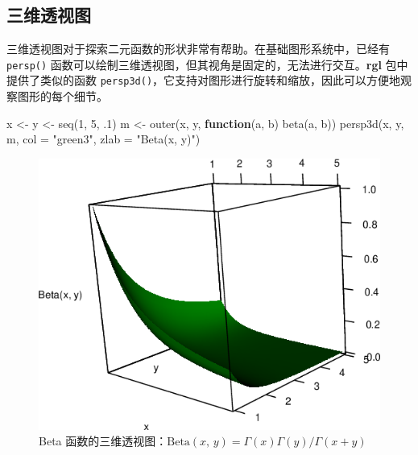 \documentclass[
  b5paper,
  UTF8,twoside]{book}
\newenvironment{Shaded}{\begin{snugshade}}{\end{snugshade}}
\newcommand{\AttributeTok}[1]{\textcolor[rgb]{0.77,0.63,0.00}{#1}}
\newcommand{\ControlFlowTok}[1]{\textcolor[rgb]{0.13,0.29,0.53}{\textbf{#1}}}
\newcommand{\DecValTok}[1]{\textcolor[rgb]{0.00,0.00,0.81}{#1}}
\newcommand{\FunctionTok}[1]{\textcolor[rgb]{0.00,0.00,0.00}{#1}}
\newcommand{\NormalTok}[1]{#1}
\newcommand{\OtherTok}[1]{\textcolor[rgb]{0.56,0.35,0.01}{#1}}
\newcommand{\StringTok}[1]{\textcolor[rgb]{0.31,0.60,0.02}{#1}}
\begin{document}
\hypertarget{ux4e09ux7ef4ux900fux89c6ux56fe}{%
\subsection{三维透视图}\label{ux4e09ux7ef4ux900fux89c6ux56fe}}

三维透视图对于探索二元函数的形状非常有帮助。在基础图形系统中，已经有 \texttt{persp()} 函数可以绘制三维透视图，但其视角是固定的，无法进行交互。\textbf{rgl} 包中提供了类似的函数 \texttt{persp3d()}，它支持对图形进行旋转和缩放，因此可以方便地观察图形的每个细节。

\begin{Shaded}
\begin{Highlighting}[]
\NormalTok{x }\OtherTok{\textless{}{-}}\NormalTok{ y }\OtherTok{\textless{}{-}} \FunctionTok{seq}\NormalTok{(}\DecValTok{1}\NormalTok{, }\DecValTok{5}\NormalTok{, .}\DecValTok{1}\NormalTok{)}
\NormalTok{m }\OtherTok{\textless{}{-}} \FunctionTok{outer}\NormalTok{(x, y, }\ControlFlowTok{function}\NormalTok{(a, b) }\FunctionTok{beta}\NormalTok{(a, b))}
\FunctionTok{persp3d}\NormalTok{(x, y, m, }\AttributeTok{col =} \StringTok{"green3"}\NormalTok{, }\AttributeTok{zlab =} \StringTok{"Beta(x, y)"}\NormalTok{)}
\end{Highlighting}
\end{Shaded}

\begin{figure}

{\centering \includegraphics{images/rgl-beta} 

}

\caption[Beta 函数的三维透视图]{Beta 函数的三维透视图：\(\mathrm{Beta}(x,\,y) = \Gamma(x)\Gamma(y)/\Gamma(x+y)\)}\label{fig:rgl-beta}
\end{figure}
\end{document}
